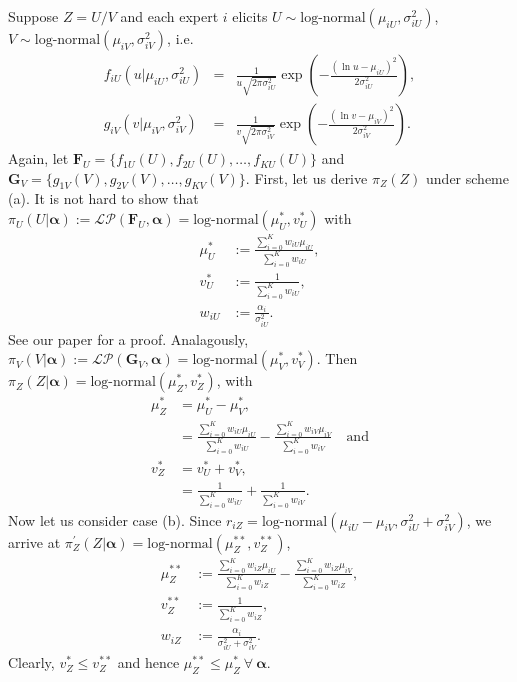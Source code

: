 \documentclass[a4paper, notitlepage, 10pt]{article}
\begin{document}
Suppose $Z = U/V$ and each expert $i$ elicits $U \sim \text{log-normal}(\mu_{iU}, \sigma_{iU}^2)$, $V \sim \text{log-normal}(\mu_{iV}, \sigma_{iV}^2)$, i.e.
\begin{eqnarray*}
\nonumber
f_{iU}(u | \mu_{iU}, \sigma_{iU}^2) &=& \frac{1}{u \sqrt{2\pi\sigma_{iU}^2}} \exp\left( - \frac{ \left( \ln u - \mu_{iU} \right)^2 }{2 \sigma_{iU}^2} \right), \\
g_{iV}(v | \mu_{iV}, \sigma_{iV}^2) &=& \frac{1}{v \sqrt{2\pi\sigma_{iV}^2}} \exp\left( - \frac{ \left( \ln v - \mu_{iV} \right)^2 }{2 \sigma_{iV}^2} \right).
\end{eqnarray*}
Again, let $\mathbf{F}_U = \{f_{1U}(U), f_{2U}(U), \ldots, f_{KU}(U) \}$ and $\mathbf{G}_V = \{g_{1V}(V), g_{2V}(V), \ldots, g_{KV}(V) \}$.
First, let us derive $\pi_Z(Z)$ under scheme (a).
It is not hard to show that  $\pi_U(U | \boldsymbol\alpha) := \mathcal{LP}(\mathbf{F}_{U}, \boldsymbol \alpha) =  \text{log-normal}(\mu_U^\ast, v_U^\ast)$ with
\begin{align}
 \mu_U^\ast &:= \frac{\sum_{i=0}^K w_{iU} \mu_{iU}}{\sum_{i=0}^K w_{iU}}, \\
 v_U^\ast &:= \frac{1}{\sum_{i=0}^K w_{iU} }, \\
 w_{iU} &:=  \frac{\alpha_i}{\sigma_{iU}^2}.
\end{align}
See our paper for a proof.
Analagously, $\pi_V(V | \boldsymbol\alpha) := \mathcal{LP}(\mathbf{G}_{V}, \boldsymbol \alpha) =  \text{log-normal}(\mu_V^\ast, v_V^\ast)$.
Then $\pi_Z(Z |  \boldsymbol \alpha) = \text{log-normal}(\mu_Z^{\ast}, v_Z^{\ast})$, with
\begin{align}
\nonumber
 \mu_Z^{\ast} &= \mu_U^\ast - \mu_V^\ast,\\
 &= \frac{\sum_{i=0}^K w_{iU} \mu_{iU}}{\sum_{i=0}^K w_{iU}} - \frac{\sum_{i=0}^K w_{iV} \mu_{iV}}{\sum_{i=0}^K w_{iV}}\quad \text{and} \\
 \nonumber
v_Z^{\ast} &= v_U^\ast + v_V^\ast, \\
&= \frac{1}{\sum_{i=0}^K w_{iU} } + \frac{1}{\sum_{i=0}^K w_{iV} }.
\end{align}
Now let us consider case (b).
Since $r_{iZ} = \text{log-normal}(\mu_{iU} - \mu_{iV}, \sigma_{iU}^2 +  \sigma_{iV}^2)$, we arrive at  $\pi_Z^{\prime}(Z |  \boldsymbol \alpha) = \text{log-normal}(\mu_Z^{\ast\ast}, v_Z^{\ast\ast})$,
\begin{align}
 \mu_Z^{\ast\ast} &:= \frac{\sum_{i=0}^K w_{iZ} \mu_{iU}}{\sum_{i=0}^K w_{iZ}} - \frac{\sum_{i=0}^K w_{iZ} \mu_{iV}}{\sum_{i=0}^K w_{iZ}}, \\
 v_Z^{\ast\ast} &:= \frac{1}{\sum_{i=0}^K w_{iZ} }, \\
 w_{iZ} &:=  \frac{\alpha_i}{\sigma_{iU}^2 + \sigma_{iV}^2}.
\end{align}
Clearly, $v_Z^{\ast} \leq v_Z^{\ast\ast}$ and hence $\mu_Z^{\ast\ast} \leq \mu_Z^{\ast} \: \forall \: \boldsymbol\alpha$.
\end{document}
